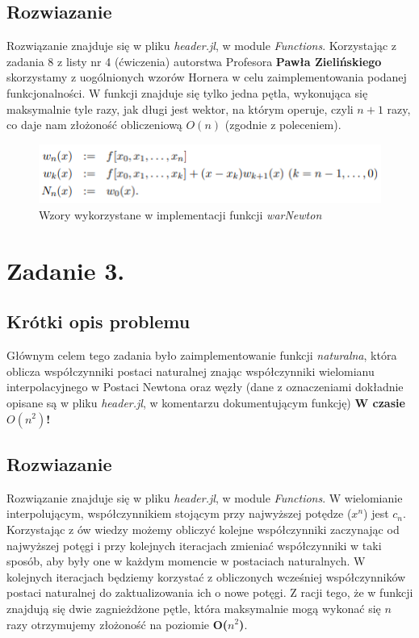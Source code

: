\documentclass[a4paper,14pt]{report}
\begin{document}
  \section{Rozwiazanie}
    Rozwiązanie znajduje się w pliku \textit{header.jl}, w module \textit{Functions}. Korzystając z zadania 8 z listy nr 4 (ćwiczenia) autorstwa Profesora \textbf{Pawła Zielińskiego} skorzystamy z uogólnionych wzorów Hornera w celu zaimplementowania podanej funkcjonalności. W funkcji znajduje się tylko jedna pętla, wykonująca się maksymalnie tyle razy, jak długi jest wektor, na którym operuje, czyli $n+1$ razy, co daje nam złożoność obliczeniową $O(n)$ (zgodnie z poleceniem).
    \begin{figure}[H]
      \includegraphics[scale=1.0]{warNewton}
      \centering
      \caption{Wzory wykorzystane w implementacji funkcji \textit{warNewton}}
    \end{figure}
\chapter{Zadanie 3.}
  \section{Krótki opis problemu}
    Głównym celem tego zadania było zaimplementowanie funkcji \textit{naturalna}, która oblicza współczynniki postaci naturalnej znając współczynniki wielomianu interpolacyjnego w Postaci Newtona oraz węzły (dane z oznaczeniami dokładnie opisane są w pliku \textit{header.jl}, w komentarzu dokumentującym funkcję) \textbf{W czasie $O(n^{2})$!}
  \section{Rozwiazanie}
    Rozwiązanie znajduje się w pliku \textit{header.jl}, w module \textit{Functions}. W wielomianie interpolującym, współczynnikiem stojącym przy najwyższej potędze ($x^{n}$) jest $c_{n}$. Korzystając z ów wiedzy możemy obliczyć kolejne współczynniki zaczynając od najwyższej potęgi i przy kolejnych iteracjach zmieniać współczynniki w taki sposób, aby były one w każdym momencie w postaciach naturalnych. W kolejnych iteracjach będziemy korzystać z obliczonych wcześniej współczynników postaci naturalnej do zaktualizowania ich o nowe potęgi. Z racji tego, że w funkcji znajdują się dwie zagnieżdżone pętle, która maksymalnie mogą wykonać się $n$ razy otrzymujemy złożoność na poziomie \textbf{O($n^{2}$)}.
\end{document}
